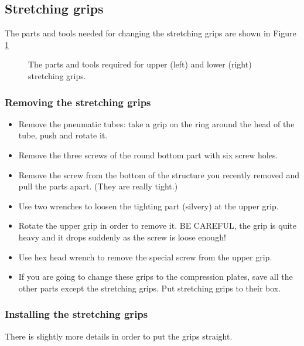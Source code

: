 \documentclass[a4paper]{article}
\begin{document}
\subsection{Stretching grips}

The parts and tools needed for changing the stretching grips are shown in Figure \ref{streparts}

\begin{figure}[t]
\centering 
{}
\caption{The parts and tools required for upper (left) and lower (right) stretching grips.}
\label{streparts}
\end{figure}

\subsubsection{Removing the stretching grips}

\begin{itemize}
  \item Remove the pneumatic tubes: take a grip on the ring around the head of the tube, push and rotate it.
  \item Remove the three screws of the round bottom part with six screw holes.
  \item Remove the screw from the bottom of the structure you recently removed and pull the parts apart. (They are really tight.)
  \item Use two wrenches to loosen the tighting part (silvery) at the upper grip.
  \item Rotate the upper grip in order to remove it. BE CAREFUL, the grip is quite heavy and it drops suddenly as the screw is loose enough!
  \item Use hex head wrench to remove the special screw from the upper grip.
  \item If you are going to change these grips to the compression plates, save all the other parts except the stretching grips. Put stretching grips to their box.
\end{itemize}

\subsubsection{Installing the stretching grips}

There is slightly more details in order to put the grips straight.
\end{document}
